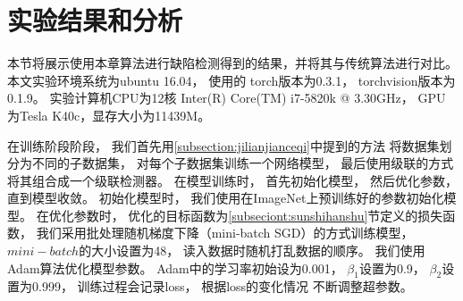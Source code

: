 \section{实验结果和分析}

本节将展示使用本章算法进行缺陷检测得到的结果，并将其与传统算法进行对比。
本文实验环境系统为ubuntu 16.04，
使用的
torch版本为0.3.1，
torchvision版本为0.1.9。
实验计算机CPU为12核 Inter(R) Core(TM) i7-5820k @ 3.30GHz，
GPU为Tesla K40c，显存大小为11439M。


在训练阶段阶段，
我们首先用\ref{subsection:jilianjianceqi}中提到的方法
将数据集划分为不同的子数据集，
对每个子数据集训练一个网络模型，
最后使用级联的方式将其组合成一个级联检测器。
在模型训练时，
首先初始化模型，
然后优化参数，
直到模型收敛。
初始化模型时，
我们使用在ImageNet上预训练好的参数初始化模型。
在优化参数时，
优化的目标函数为\ref{subseciont:sunshihanshu}节定义的损失函数，
我们采用批处理随机梯度下降（mini-batch SGD）的方式训练模型，
$mini-batch$的大小设置为48，
读入数据时随机打乱数据的顺序。
我们使用Adam算法优化模型参数。
Adam中的学习率初始设为0.001，
$\beta_1$设置为0.9，
$\beta_2$设置为0.999，
训练过程会记录loss，
根据loss的变化情况
不断调整超参数。

